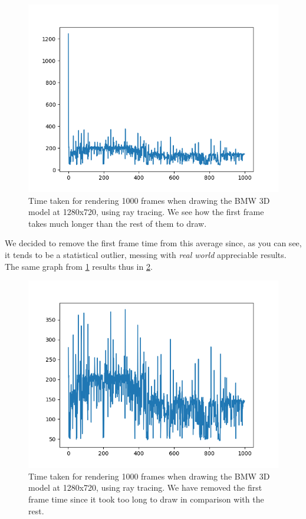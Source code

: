 \begin{figure}[hbt!]
    \centering
    \includegraphics[width=1.0\textwidth]{figuras/frametime-outlier.png}
    \caption{Time taken for rendering 1000 frames when drawing the BMW 3D model at 1280x720, using ray tracing. We see how the first frame takes much longer than the rest of them to draw.}
    \label{frametimes-outlier-graph}
\end{figure}

We decided to remove the first frame time from this average since, as you can see, it tends to be a statistical outlier, messing with \textit{real world} appreciable results. The same graph from \ref{frametimes-outlier-graph} results thus in \ref{frametimes-no-outlier-graph}.

\begin{figure}[hbt!]
    \centering
    \includegraphics[width=1.0\textwidth]{figuras/frametime-no-outlier.png}
    \caption{Time taken for rendering 1000 frames when drawing the BMW 3D model at 1280x720, using ray tracing. We have removed the first frame time since it took too long to draw in comparison with the rest.}
    \label{frametimes-no-outlier-graph}
\end{figure}

